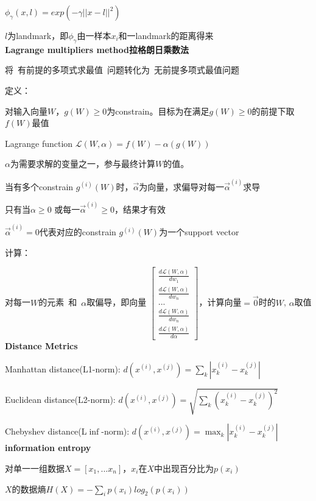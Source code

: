 \documentclass[UTF8]{ctexart}
\begin{document}
  $\phi_{\gamma}(x, l) = exp(-\gamma||x-l||^2)$

  \quad $l$为landmark，即$\phi_{\gamma}$由一样本$x_i$和一landmark的距离得来\\
\textbf{Lagrange multipliers method拉格朗日乘数法}

  将\ 有前提的多项式求最值\ 问题转化为\ 无前提多项式最值问题

  定义：

  \quad 对输入向量$W$，$g(W) \geq 0$为constrain。目标为在满足$g(W) \geq 0$的前提下取$f(W)$最值

  \quad Lagrange function $\mathcal{L} (W, \alpha) = f(W) - \alpha(g(W))$

  \quad \quad $\alpha$为需要求解的变量之一，参与最终计算$W$的值。

  \quad \quad 当有多个constrain $g^{(i)}(W)$时，$\vec{\alpha}$为向量，求偏导对每一$\vec{\alpha}^{(i)}$求导

  \quad \quad 只有当$\alpha \geq 0$ 或每一$\vec{\alpha}^{(i)} \geq 0$，结果才有效

  \quad \quad $\vec{\alpha}^{(i)} = 0$代表对应的constrain $g^{(i)}(W)$为一个support vector

  计算：
  
  \quad 对每一$W$的元素\ 和\ $\alpha$取偏导，即向量
  $\begin{bmatrix}
    \frac{d \mathcal{L}(W, \alpha)}{d w_1}  \\
    \frac{d \mathcal{L}(W, \alpha)}{d w_n} \\
    ... \\
    \frac{d \mathcal{L}(W, \alpha)}{d w_n} \\
    \frac{d \mathcal{L}(W, \alpha)}{d \alpha}
  \end{bmatrix}$，计算向量$=\vec{0} $时的$W$, $\alpha$取值\\
\textbf{Distance Metrics}

  Manhattan distance(L1-norm): $d(x^{(i)}, x^{(j)}) = \sum_k |x^{(i)}_k - x^{(j)}_k|$

  Euclidean distance(L2-norm): $d(x^{(i)}, x^{(j)}) = \sqrt{\sum_k (x^{(i)}_k - x^{(j)}_k) ^ 2}$

  Chebyshev distance(L$\inf$-norm): $d(x^{(i)}, x^{(j)}) = \max_k |x^{(i)}_k - x^{(j)}_k|$\\
\textbf{information entropy}

  对单一一组数据$X = [x_1, ... x_n]$，$x_i$在$X$中出现百分比为$p(x_i)$
  
  $X$的数据熵$H(X) = -\sum_i p(x_i)log_2(p(x_i))$
\end{document}
